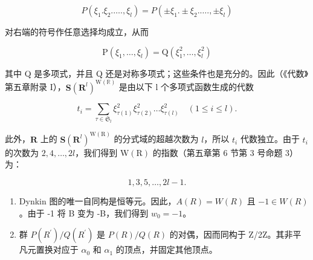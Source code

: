 \[
P \left(\xi_ {1}. \xi_ {2}. \dots ., \xi_ {l}\right) = P \left(\pm \xi_ {1}. \pm \xi_ {2}. \dots ., \pm \xi_ {l}\right)
\]

对右端的符号作任意选择均成立，从而

\[
\mathrm{P} \left(\xi_ {1}, \dots , \xi_ {l}\right) = \mathrm{Q} \left(\xi_ {1} ^ {2}, \dots , \xi_ {l} ^ {2}\right)
\]

其中 Q 是多项式，并且 Q 还是对称多项式；这些条件也是充分的。因此（《代数》第五章附录 I），\(\mathbf{S}(\mathbf{R}^{l})^{\mathrm{W}(\mathbb{R})}\) 是由以下 l 个多项式函数生成的代数

\[
t _ {i} = \sum_ {\tau \in \mathfrak {S} _ {l}} \xi_ {\tau (1)} ^ {2} \xi_ {\tau (2)} ^ {2} \dots \xi_ {\tau (l)} ^ {2} \quad (1 \leqslant i \leqslant l).
\]

此外，\(\mathbf{R}\) 上的 \(\mathbf{S}(\mathbf{R}^l)^{\mathrm{W(R)}}\) 的分式域的超越次数为 \(l\)，所以 \(t_i\) 代数独立。由于 \(t_i\) 的次数为 \(2,4,\ldots ,2l\)，我们得到 \(\mathrm{W(R)}\) 的指数（第五章第 6 节第 3 号命题 3）为：

\[
1, 3, 5, \dots , 2 l - 1.
\]

\begin{enumerate}
\def\labelenumi{(\Roman{enumi})}
\setcounter{enumi}{10}
\item
  Dynkin 图的唯一自同构是恒等元。因此，\(A(R) = W(R)\) 且 \(-1 \in W(R)\)。由于 -1 将 B 变为 -B，我们得到 \(w_{0} = -1\)。
\item
  群 \(P(R^{\prime})/Q(R^{\prime})\) 是 \(P(R)/Q(R)\) 的对偶，因而同构于 Z/2Z。其非平凡元置换对应于 \(\alpha_{0}\) 和 \(\alpha_{1}\) 的顶点，并固定其他顶点。
\end{enumerate}
\relax{}
